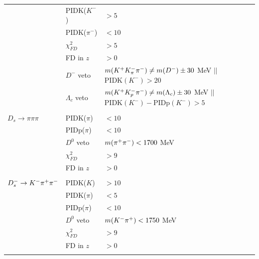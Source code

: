 \begin{table}[h]
{\begin{tabular}{l l l}
& PIDK($K^-$) & $> 5$ \\
& PIDK($\pi^-$) & $< 10$ \\
&  $\chi^{2}_{FD}$ & $> 5$ \\
&  FD in $z$  &$ > 0$ \\
& $D^-$ veto  & $m({{K}^+} K^-_\pi {\ensuremath{{\pi}^-}}) \ne m(D^-) \pm 30$ MeV  $||$ $\text{PIDK}(K^-) > 20$\\
& $\Lambda_c$ veto  & $m({{K}^+} K^-_p {{\pi}^-}) \ne m(\Lambda_c) \pm 30$ MeV  $||$ $\text{PIDK}(K^-)-\text{PIDp}(K^-) > 5$ \\
\\
$D_s \to \pi \pi \pi$ & PIDK($\pi$) & $< 10$  \\
& PIDp($\pi$) & $< 10$ \\
& $D^0$ veto  & $m({{\pi}^+} {{\pi}^-}) < 1700$ MeV \\
&  $\chi^{2}_{FD}$ & $> 9$ \\
&  FD in $z$  &$ > 0$ \\
\\
$D_s^- \rightarrow K^- {{\pi}^+} {{\pi}^-}$ & PIDK($K$) & $> 10$  \\
& PIDK($\pi$) & $< 5$ \\
& PIDp($\pi$) & $< 10$ \\
& $D^0$ veto  & $m(K^- {{\pi}^+}) < 1750$ MeV \\
&  $\chi^{2}_{FD}$ & $> 9$ \\
&  FD in $z$  &$ > 0$ \\
\\
\hline
\hline
\end{tabular}
}
\label{table:selDs}
\end{table}



